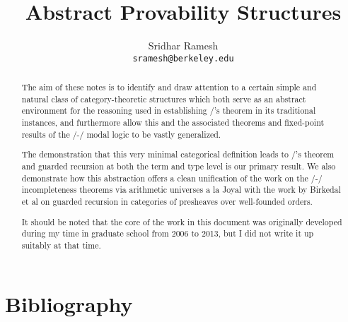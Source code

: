 \documentclass[12pt]{article}
\title{Abstract Provability Structures}
\author{
  Sridhar Ramesh\\
  \texttt{sramesh@berkeley.edu}
}
\begin{document}
\maketitle

\begin{abstract}

The aim of these notes is to identify and draw attention to a certain simple and natural class of category-theoretic structures which both serve as an abstract environment for the reasoning used in establishing \Loeb/'s theorem in its traditional instances, and furthermore allow this and the associated theorems and fixed-point results of the \Goedel/-\Loeb/ modal logic to be vastly generalized.

The demonstration that this very minimal categorical definition leads to \Loeb/'s theorem and guarded recursion at both the term and type level is our primary result. We also demonstrate how this abstraction offers a clean unification of the work on the \Godel/-\Lob/ incompleteness theorems via arithmetic universes a la Joyal with the work by Birkedal et al on guarded recursion in categories of presheaves over well-founded orders.

It should be noted that the core of the work in this document was originally developed during my time in graduate school from 2006 to 2013, but I did not write it up suitably at that time.
\end{abstract}

\newpage
\tableofcontents

\newpage
\setcounter{section}{-1}
\setcounter{page}{1}













\newpage \section{Bibliography}
\printbibliography

\printindex
\end{document}
